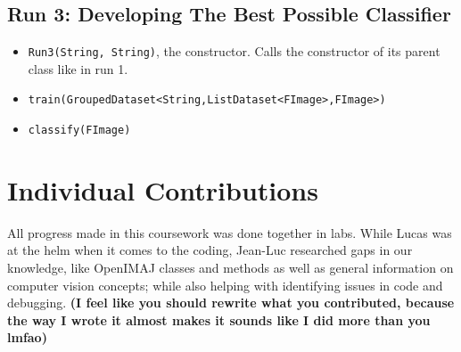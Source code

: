 \documentclass[a4paper,12pt]{article}
\begin{document}
\subsection{Run 3: Developing The Best Possible Classifier}
\begin{itemize}
	\item \texttt{Run3(String, String)}, the constructor. Calls the constructor of its parent class like in run 1.
	\item \texttt{train(GroupedDataset<String,ListDataset<FImage>,FImage>)}
	\item \texttt{classify(FImage)}
\end{itemize}

\section{Individual Contributions}
All progress made in this coursework was done together in labs. While Lucas was at the helm when it comes to the coding, Jean-Luc researched gaps in our knowledge, like OpenIMAJ classes and methods as well as general information on computer vision concepts; while also helping with identifying issues in code and debugging.
\textbf{(I feel like you should rewrite what you contributed, because the way I wrote it almost makes it sounds like I did more than you lmfao)}
\end{document}
